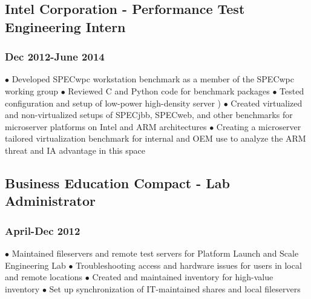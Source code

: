 \documentclass{article}
\begin{document}
\subsection*{Intel Corporation - Performance Test Engineering Intern}
\subsubsection*{Dec 2012-June 2014}

$\bullet$ Developed SPECwpc workstation benchmark as a member of the SPECwpc working group
$\bullet$ Reviewed C and Python code for benchmark packages
$\bullet$ Tested configuration and setup of low-power high-density server )
$\bullet$ Created virtualized and non-virtualized setups of SPECjbb, SPECweb, and other benchmarks for microserver platforms on Intel and ARM architectures
$\bullet$ Creating a microserver tailored virtualization benchmark for internal and OEM use to analyze the ARM threat and IA advantage in this space

\subsection*{Business Education Compact - Lab Administrator}
\subsubsection*{April-Dec 2012}

$\bullet$ Maintained fileservers and remote test servers for Platform Launch and Scale Engineering Lab
$\bullet$ Troubleshooting access and hardware issues for users in local and remote locations
$\bullet$ Created and maintained inventory for high-value inventory
$\bullet$ Set up synchronization of IT-maintained shares and local fileservers
\end{document}
